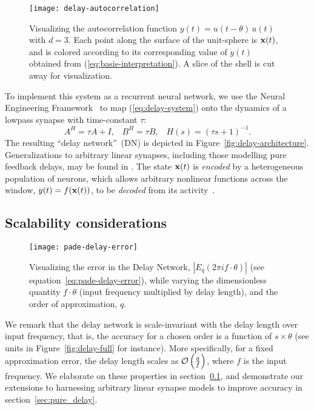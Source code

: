 \begin{figure}
\centering
  \texttt{[image: delay-autocorrelation]}
  \caption{ \label{fig:delay-autocorrelation} 
    Visualizing the autocorrelation function $y(t) = u(t - \theta)\, u(t)$ with $d=3$.
    Each point along the surface of the unit-sphere is $\mathbf{x}(t)$, and is colored according to its corresponding value of $y(t)$ obtained from (\ref{eq:basis-interpretation}).
    A slice of the shell is cut away for visualization.
  } 
\end{figure}

To implement this system as a recurrent neural network, we use the Neural Engineering Framework~\citep[NEF;][]{eliasmith2003a} to map (\ref{eq:delay-system}) onto the dynamics of a lowpass synapse with time-constant $\tau$:
\begin{equation}
A^H = \tau A + I \text{,} \quad B^H = \tau B \text{,} \quad H(s) = \left(\tau s + 1\right)^{-1} \text{.}
\end{equation}
The resulting ``delay network''~(DN) is depicted in Figure~\ref{fig:delay-architecture}.
Generalizations to arbitrary linear synapses, including those modelling pure feedback delays, may be found in %
\cite{voelker2018}.
The state $\mathbf{x}(t)$ is \emph{encoded} by a heterogeneous population of neurons, which allows arbitrary nonlinear functions across the window, $y(t) = f(\mathbf{x}(t))$, to be \emph{decoded} from its activity~\citep{eliasmith2003a}.

\subsection{Scalability considerations}
\label{sec:delay-scalability}

\begin{figure}
\centering
  \texttt{[image: pade-delay-error]}
  \caption{ \label{fig:pade-delay-error} 
    Visualizing the error in the Delay Network, $|E_q(2 \pi i f \cdot \theta)|$ (see equation~\ref{eq:pade-delay-error}), while varying the dimensionless quantity $f \cdot \theta$ (input frequency multiplied by delay length), and the order of approximation, $q$.
  } 
\end{figure}

We remark that the delay network is scale-invariant with the delay length over input frequency, that is, the accuracy for a chosen order is a function of $s \times \theta$ (see units in Figure~\ref{fig:delay-full} for instance). %
More specifically, for a fixed approximation error, the delay length scales as $\mathcal{O}\left({ \frac{q}{f} }\right)$, where $f$ is the input frequency.
We elaborate on these properties in section~\ref{sec:delay-scalability}, and demonstrate our extensions to harnessing arbitrary linear synapse models to improve accuracy in section~\ref{sec:pure_delay}.

